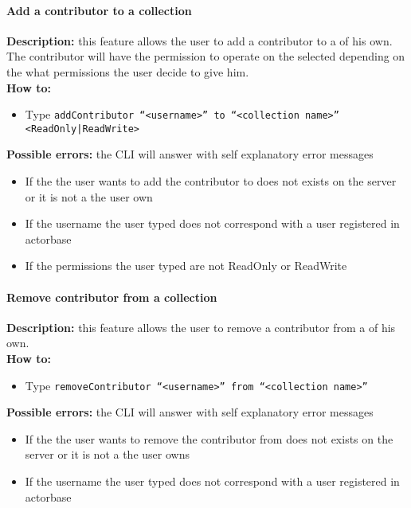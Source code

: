 \documentclass{scalatekids-article}
\begin{document}
\paragraph{Add a contributor to a collection}
\label{sec:addcontributor}
\textbf{Description:} this feature allows the user to add a contributor
to a  of his own. The contributor will have the permission to operate on the selected  depending on the what permissions the user decide to give him.\\
\textbf{How to:}
\begin{itemize}
\item Type \texttt{addContributor ``<username>'' to ``<collection name>'' <ReadOnly|ReadWrite>}
\end{itemize}
\textbf{Possible errors:} the CLI will answer with self explanatory error messages
\begin{itemize}
\item If the  the user wants to add the contributor to does not exists on the server or it is not a  the user own
\item If the username the user typed does not correspond with a user registered in actorbase
\item If the permissions the user typed are not ReadOnly or ReadWrite
\end{itemize}

\paragraph{Remove contributor from a collection}
\label{sec:removecontributor}
\textbf{Description:} this feature allows the user to remove a contributor from a  of his own.\\
\textbf{How to:}
\begin{itemize}
\item Type \texttt{removeContributor ``<username>'' from ``<collection name>''}
\end{itemize}
\textbf{Possible errors:} the CLI will answer with self explanatory error messages
\begin{itemize}
\item If the  the user wants to remove the contributor from does not exists on the server or it is not a  the user owns
\item If the username the user typed does not correspond with a user registered in actorbase
\end{itemize}
\end{document}
